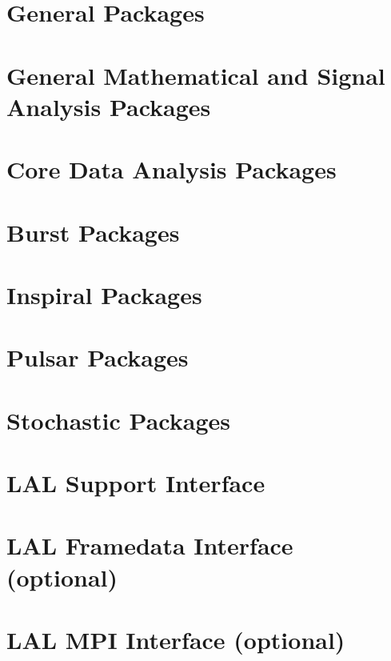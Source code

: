 \documentclass[oneside]{book}
\begin{document}
\part{General Packages}

%



\part{General Mathematical and Signal Analysis Packages}




%


\part{Core Data Analysis Packages}

\part{Burst Packages}





%

\part{Inspiral Packages}





\part{Pulsar Packages}


\part{Stochastic Packages}

\part{LAL Support Interface}

\part{LAL Framedata Interface (optional)}

\part{LAL MPI Interface (optional)}



\end{document}
